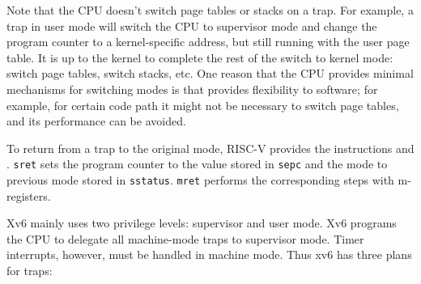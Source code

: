 Note that the CPU doesn't switch page tables or stacks on a
trap.  For example, a trap in user mode will switch the
CPU to supervisor mode and change the program counter to a
kernel-specific address, but still running with the user page table.
It is up to the kernel to complete the rest of the switch to kernel
mode: switch page tables, switch stacks, etc.  One reason that the
CPU provides minimal mechanisms for switching modes is that
provides flexibility to software; for example, for certain code path
it might not be necessary to switch page tables, and its performance
can be avoided.

To return from a trap to the original mode, RISC-V
provides the instructions  and
. \lstinline{sret} sets the program counter to the
value stored in \lstinline{sepc} and the mode to previous mode stored
in \lstinline{sstatus}. \lstinline{mret} performs the corresponding
steps with m-registers.

Xv6 mainly uses two privilege levels: supervisor and user mode.  Xv6
programs the CPU to delegate all machine-mode traps to
supervisor mode. Timer interrupts, however, must be handled in machine
mode.  Thus xv6 has three plans for traps:

